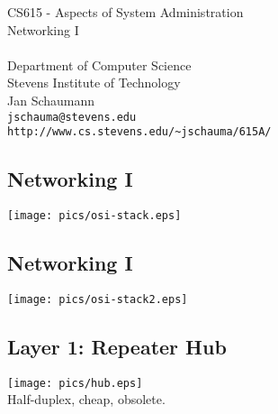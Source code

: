 \documentclass[xga]{xdvislides}
\begin{document}
\setfontphv

\lhead{\slidetitle}                               %
\cfoot{\relax}                               %
\rfoot{\Gray{\today}}

\vspace*{\fill}
\begin{center}
	\Hugesize
		CS615 - Aspects of System Administration\\ [1em]
		Networking I\\ [1em]
	\hspace*{5mm}\blueline\\ [1em]
	\Normalsize
		Department of Computer Science\\
		Stevens Institute of Technology\\
		Jan Schaumann\\
		\verb+jschauma@stevens.edu+\\
		\verb+http://www.cs.stevens.edu/~jschauma/615A/+
\end{center}
\vspace*{\fill}

\subsection{Networking I}
\vspace*{\fill}
\begin{center}
	\texttt{[image: pics/osi-stack.eps]}
\end{center}
\vspace*{\fill}

\subsection{Networking I}
\vspace*{\fill}
\begin{center}
	\texttt{[image: pics/osi-stack2.eps]}
\end{center}
\vspace*{\fill}

\subsection{Layer 1: Repeater Hub}
\vspace*{\fill}
\begin{center}
	\texttt{[image: pics/hub.eps]} \\
	Half-duplex, cheap, obsolete.
\end{center}
\vspace*{\fill}
\end{document}
